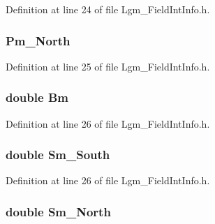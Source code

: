Definition at line 24 of file Lgm\_\-FieldIntInfo.h.\hypertarget{struct_lgm___field_int_info_680815020ea7ef4edf84c04a0d7f1f20}{
\subsubsection[{Pm\_\-North}]{ {\bf Pm\_\-North}}}
\label{struct_lgm___field_int_info_680815020ea7ef4edf84c04a0d7f1f20}




Definition at line 25 of file Lgm\_\-FieldIntInfo.h.\hypertarget{struct_lgm___field_int_info_8e90af044e680fe06a5f4745ead8b8d7}{
\subsubsection[{Bm}]{\setlength{\rightskip}{0pt plus 5cm}double {\bf Bm}}}
\label{struct_lgm___field_int_info_8e90af044e680fe06a5f4745ead8b8d7}




Definition at line 26 of file Lgm\_\-FieldIntInfo.h.\hypertarget{struct_lgm___field_int_info_91d445e45d4679505b1a9b5b7cde690c}{
\subsubsection[{Sm\_\-South}]{\setlength{\rightskip}{0pt plus 5cm}double {\bf Sm\_\-South}}}
\label{struct_lgm___field_int_info_91d445e45d4679505b1a9b5b7cde690c}




Definition at line 26 of file Lgm\_\-FieldIntInfo.h.\hypertarget{struct_lgm___field_int_info_e133118dcb4b4b581ae49086e9d16be3}{
\subsubsection[{Sm\_\-North}]{\setlength{\rightskip}{0pt plus 5cm}double {\bf Sm\_\-North}}}
\label{struct_lgm___field_int_info_e133118dcb4b4b581ae49086e9d16be3}




